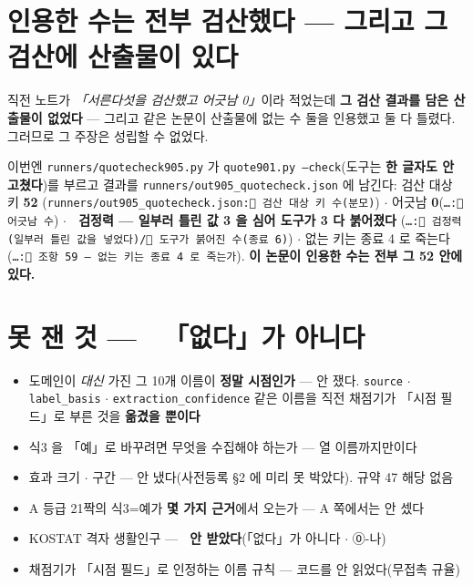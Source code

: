 \documentclass{article}
\begin{document}
\section{인용한 수는 전부 검산했다 --- 그리고 그 검산에 산출물이 있다}

직전 노트가 \emph{「서른다섯을 검산했고 어긋남 0」}이라 적었는데 \textbf{그 검산 결과를
담은 산출물이 없었다} --- 그리고 같은 논문이 산출물에 없는 수 둘을 인용했고 둘 다 틀렸다.
그러므로 그 주장은 성립할 수 없었다.

이번엔 \texttt{runners/quotecheck905.py} 가 \texttt{quote901.py --check}(도구는 \textbf{한 글자도
안 고쳤다})를 부르고 결과를 \texttt{runners/out905\_quotecheck.json} 에 남긴다:
검산 대상 키 \textbf{52}
(\texttt{runners/out905\_quotecheck.json:🔴 검산 대상 키 수(분모)}) $\cdot$
어긋남 \textbf{0}(\texttt{…:🔴 어긋남 수}) $\cdot$
🔴 \textbf{검정력 --- 일부러 틀린 값 3 을 심어 도구가 3 다 붉어졌다}
(\texttt{…:🔴 검정력(일부러 틀린 값을 넣었다)/🔴 도구가 붉어진 수(종료 6)}) $\cdot$
없는 키는 종료 4 로 죽는다(\texttt{…:🔴 조항 59 — 없는 키는 종료 4 로 죽는가}).
\textbf{이 논문이 인용한 수는 전부 그 52 안에 있다.}

\section{못 잰 것 --- 🔴 「없다」가 아니다}

\begin{itemize}
\item 도메인이 \emph{대신} 가진 그 10개 이름이 \textbf{정말 시점인가} --- 안 쟀다.
\texttt{source} $\cdot$ \texttt{label\_basis} $\cdot$ \texttt{extraction\_confidence} 같은
이름을 직전 채점기가 「시점 필드」로 부른 것을 \textbf{옮겼을 뿐이다}
\item 식3 을 「예」로 바꾸려면 무엇을 수집해야 하는가 --- 열 이름까지만이다
\item 효과 크기 $\cdot$ 구간 --- 안 냈다(사전등록 \S 2 에 미리 못 박았다). 규약 47 해당 없음
\item A 등급 21짝의 식3=예가 \textbf{몇 가지 근거}에서 오는가 --- A 쪽에서는 안 셌다
\item KOSTAT 격자 생활인구 --- 🔴 \textbf{안 받았다}(「없다」가 아니다 $\cdot$ ⓪-나)
\item 채점기가 「시점 필드」로 인정하는 이름 규칙 --- 코드를 안 읽었다(무접촉 규율)
\end{itemize}
\end{document}
